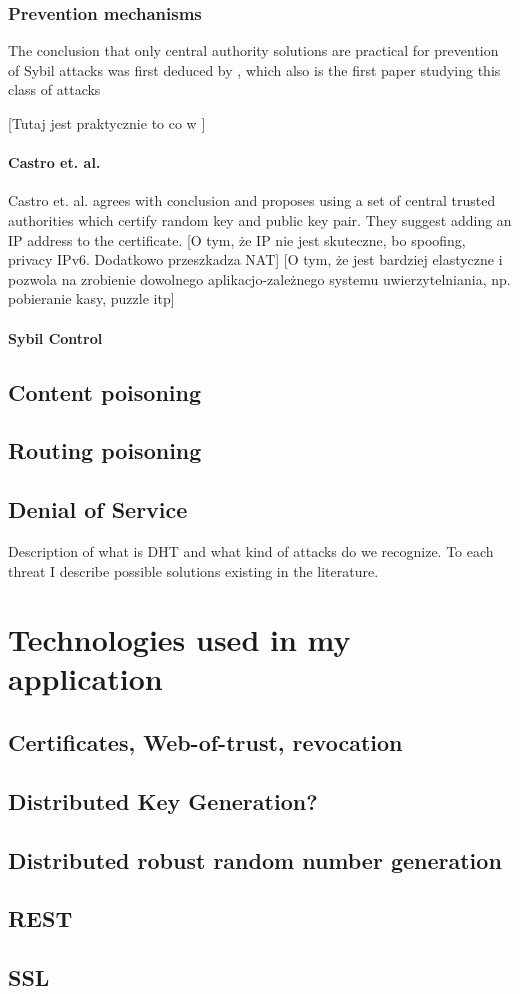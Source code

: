 \subsection{Prevention mechanisms}

  The conclusion that only central authority solutions are practical for
  prevention of Sybil attacks was first deduced by \cite{dou02}, which also is
  the first paper studying this class of attacks \cite[p. 5]{urd11}

  [Tutaj jest praktycznie to co w \cite{urd11}]
  \subsubsection{Castro et. al.}
  Castro et. al. \cite{cas02} agrees with \cite{dou02} conclusion and proposes
  using a set of central trusted authorities which certify random key and public
  key pair. They suggest adding an IP address to the certificate.
  [O tym, że IP nie jest skuteczne, bo spoofing, privacy IPv6. Dodatkowo
  przeszkadza NAT]
  [O tym, że jest bardziej elastyczne i pozwola na zrobienie dowolnego
  aplikacjo-zależnego systemu uwierzytelniania, np. pobieranie kasy, puzzle itp]

  \subsubsection{Sybil Control}



  \section{Content poisoning}
  \section{Routing poisoning}

  \section{Denial of Service}

Description of what is DHT and what kind of attacks do we recognize. To each
threat I describe possible solutions existing in the literature.


\chapter{Technologies used in my application}

\section{Certificates, Web-of-trust, revocation}
\section{Distributed Key Generation?}
\section{Distributed robust random number generation}
\section{REST}
\section{SSL}

